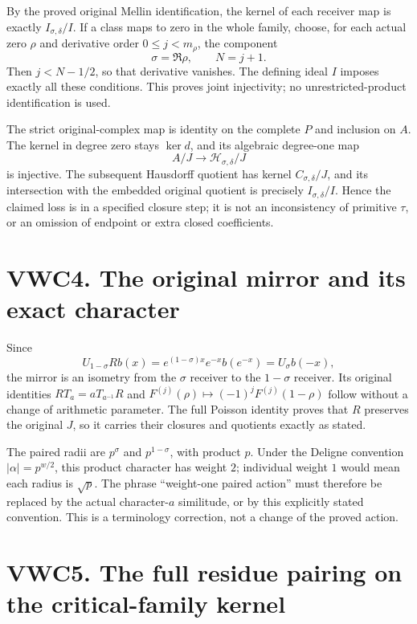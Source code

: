 By the proved original Mellin identification, the kernel of each
receiver map is exactly \(I_{\sigma,\delta}/I\). If a class maps to zero
in the whole family, choose, for each actual zero \(\rho\) and
derivative order \(0\leq j<m_\rho\), the component \[
\sigma=\Re\rho,\qquad N=j+1.
\] Then \(j<N-1/2\), so that derivative vanishes. The defining ideal
\(I\) imposes exactly all these conditions. This proves joint
injectivity; no unrestricted-product identification is used.

The strict original-complex map is identity on the complete \(P\) and
inclusion on \(A\). The kernel in degree zero stays \(\ker d\), and its
algebraic degree-one map \[
A/J\longrightarrow\mathcal H_{\sigma,\delta}/J
\] is injective. The subsequent Hausdorff quotient has kernel
\(C_{\sigma,\delta}/J\), and its intersection with the embedded original
quotient is precisely \(I_{\sigma,\delta}/I\). Hence the claimed loss is
in a specified closure step; it is not an inconsistency of primitive
\(\tau\), or an omission of endpoint or extra closed coefficients.

\section{VWC4. The original mirror and its exact
character}\label{vwc4.-the-original-mirror-and-its-exact-character}

Since \[
U_{1-\sigma}Rb(x)
=e^{(1-\sigma)x}e^{-x}b(e^{-x})
=U_\sigma b(-x),
\] the mirror is an isometry from the \(\sigma\) receiver to the
\(1-\sigma\) receiver. Its original identities \(RT_a=aT_{a^{-1}}R\) and
\(F^{(j)}(\rho)\mapsto(-1)^jF^{(j)}(1-\rho)\) follow without a change of
arithmetic parameter. The full Poisson identity proves that \(R\)
preserves the original \(J\), so it carries their closures and quotients
exactly as stated.

The paired radii are \(p^\sigma\) and \(p^{1-\sigma}\), with product
\(p\). Under the Deligne convention \(|\alpha|=p^{w/2}\), this product
character has weight \(2\); individual weight \(1\) would mean each
radius is \(\sqrt p\). The phrase ``weight-one paired action'' must
therefore be replaced by the actual character-\(a\) similitude, or by
this explicitly stated convention. This is a terminology correction, not
a change of the proved action.

\section{VWC5. The full residue pairing on the critical-family
kernel}\label{vwc5.-the-full-residue-pairing-on-the-critical-family-kernel}

